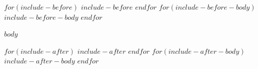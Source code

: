 \documentclass[11pt,b5paper]{article}
\begin{document}
$for(include-before)$
$include-before$
$endfor$
$for(include-before-body)$
$include-before-body$
$endfor$

$body$

$for(include-after)$
$include-after$
$endfor$
$for(include-after-body)$
$include-after-body$
$endfor$
\end{document}
